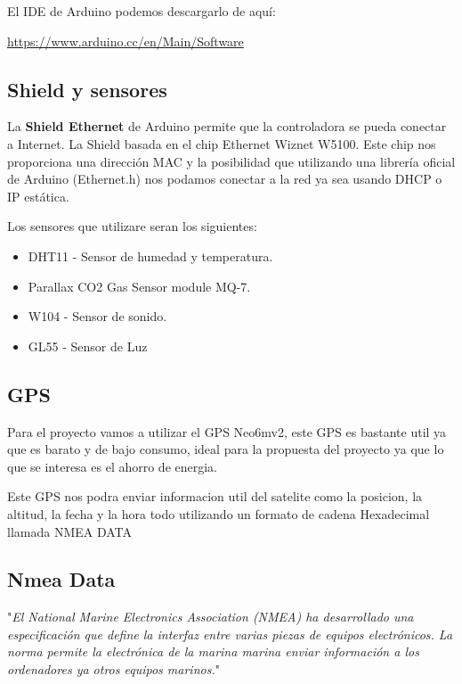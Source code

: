 El IDE de Arduino podemos descargarlo de aquí:

\url{https://www.arduino.cc/en/Main/Software}

\subsection{Shield y sensores}

La \textbf{Shield Ethernet} de Arduino permite que la controladora se pueda conectar a Internet. La Shield basada en el chip Ethernet Wiznet W5100. Este chip nos proporciona una dirección MAC y la posibilidad que utilizando una librería oficial de Arduino (Ethernet.h) nos podamos conectar a la red ya sea usando DHCP o IP estática.

Los sensores que utilizare seran los siguientes:

\begin{itemize}
	\item DHT11 - Sensor de humedad y temperatura.
	\item Parallax CO2 Gas Sensor module MQ-7.
	\item W104 - Sensor de sonido.
	\item GL55 - Sensor de Luz
	
\end{itemize}



\subsection{GPS}

Para el proyecto vamos a utilizar el GPS Neo6mv2, este GPS es bastante util ya que es barato y de bajo consumo, ideal para la propuesta del proyecto ya que lo que se interesa es el ahorro de energia.

Este GPS nos podra enviar informacion util del satelite como la posicion, la altitud, la fecha y la hora todo utilizando un formato de cadena Hexadecimal llamada NMEA DATA

\subsection{Nmea Data}

"\textit{El National Marine Electronics Association (NMEA) ha desarrollado una especificación que define la interfaz entre varias piezas de equipos electrónicos. La norma permite la electrónica de la marina marina enviar información a los ordenadores ya otros equipos marinos.}"

